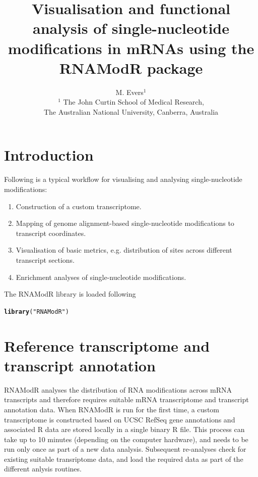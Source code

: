 \documentclass[a4paper,11pt]{article}\usepackage[]{graphicx}\usepackage[]{color}
\author{M. Evers$^{1}$\\[1em]
\small{$^{1}$ The John Curtin School of Medical Research,}\\\small{The Australian National University, Canberra, Australia}}
\title{Visualisation and functional analysis of single-nucleotide modifications in mRNAs using the RNAModR package}
\makeatletter
\newcommand{\hlstr}[1]{\textcolor[rgb]{0.192,0.494,0.8}{#1}}%
\newcommand{\hlstd}[1]{\textcolor[rgb]{0.345,0.345,0.345}{#1}}%
\newcommand{\hlkwd}[1]{\textcolor[rgb]{0.737,0.353,0.396}{\textbf{#1}}}%
\newenvironment{kframe}{%
 \def\at@end@of@kframe{}%
 \ifinner\ifhmode%
  \def\at@end@of@kframe{\end{minipage}}%
  \begin{minipage}{\columnwidth}%
 \fi\fi%
 \def\FrameCommand##1{\hskip\@totalleftmargin \hskip-\fboxsep
 \colorbox{shadecolor}{##1}\hskip-\fboxsep
     \hskip-\linewidth \hskip-\@totalleftmargin \hskip\columnwidth}%
 \MakeFramed {\advance\hsize-\width
   \@totalleftmargin\z@ \linewidth\hsize
   \@setminipage}}%
 {\par\unskip\endMakeFramed%
 \at@end@of@kframe}
\newenvironment{knitrout}{}{} %
\makeatother
\begin{document}
\maketitle

\section{Introduction}
Following is a typical workflow for visualising and analysing single-nucleotide modifications:
\begin{enumerate}
  \item Construction of a custom transcriptome.
  \item Mapping of genome alignment-based single-nucleotide modifications to transcript coordinates.
  \item Visualisation of basic metrics, e.g. distribution of sites across different transcript sections.
  \item Enrichment analyses of single-nucleotide modifications.
\end{enumerate}
The RNAModR library is loaded following
\begin{knitrout}
\color{fgcolor}\begin{kframe}
\begin{alltt}
\hlkwd{library}\hlstd{(}\hlstr{"RNAModR"}\hlstd{)}
\end{alltt}
\end{kframe}
\end{knitrout}

\section{Reference transcriptome and transcript annotation}
RNAModR analyses the distribution of RNA modifications across mRNA transcripts and therefore requires suitable mRNA transcriptome and transcript annotation data. When RNAModR is run for the first time, a custom transcriptome is constructed based on UCSC RefSeq gene annotations and associated R data are stored locally in a single binary R file. This process can take up to 10 minutes (depending on the computer hardware), and needs to be run only once as part of a new data analysis. Subsequent re-analyses check for existing suitable transriptome data, and load the required data as part of the different anlysis routines.\par
\end{document}
